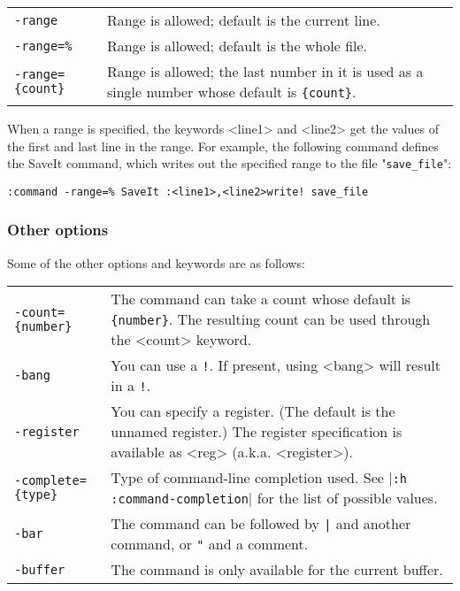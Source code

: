 \begin{center} \begin{tabularx}{0.75\textwidth}{l X}
				\texttt{-range} & Range is allowed; default is the current line. \\
				\texttt{-range=\%} & Range is allowed; default is the whole file. \\
				\texttt{-range=\{count\}} & Range is allowed; the last number in it is used as a single number whose default is \texttt{\{count\}}. \\
\end{tabularx} \end{center}

When a range is specified, the keywords <line1> and <line2> get the values of the first and last line in the range.
For example, the following command defines the SaveIt command, which writes out the specified range to the file "\texttt{save\_file}":

\begin{Verbatim}[samepage=true]
 :command -range=% SaveIt :<line1>,<line2>write! save_file
\end{Verbatim}
\subsubsection{Other options}
Some of the other options and keywords are as follows:

\begin{center} \begin{tabularx} {\textwidth}{l X} %
				\texttt{-count=\{number\}} & The command can take a count whose default is \texttt{\{number\}}.  The resulting count can be used through the <count> keyword. \\
				\texttt{-bang} & You can use a \texttt{!}.  If present, using <bang> will result in a \texttt{!}. \\
				\texttt{-register} & You can specify a register.  (The default is the unnamed register.) The register specification is available as <reg> (a.k.a. <register>). \\
				\texttt{-complete=\{type\}} & Type of command-line completion used.  See |\texttt{:h :command-completion}| for the list of possible values. \\
				\texttt{-bar} & The command can be followed by \texttt{|} and another command, or \texttt{"} and a comment. \\
				\texttt{-buffer} & The command is only available for the current buffer. \\
\end{tabularx} \end{center}

